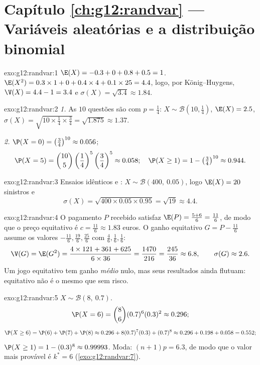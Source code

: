 \section*{Capítulo \ref{ch:g12:randvar} --- Variáveis aleatórias e a distribuição binomial}

\begin{solution}{exo:g12:randvar:1}
$\E(X) = -0.3 + 0 + 0.8 + 0.5 = 1$.
$\E(X^2) = 0.3 \times 1 + 0 + 0.4\times4 + 0.1\times25 = 4.4$, logo, por
König--Huygens, $\V(X) = 4.4 - 1 = 3.4$ e
$\sigma(X) = \sqrt{3.4} \approx 1.84$.
\end{solution}

\begin{solution}{exo:g12:randvar:2}
\emph{1.} As $10$ questões são   com
$p = \frac14$: $X \sim \mathcal B\left(10, \frac14\right)$,
$\E(X) = 2.5$,
$\sigma(X) = \sqrt{10 \times \frac14 \times \frac34} = \sqrt{1.875}
\approx 1.37$.

\emph{2.} $\P(X = 0) = \left(\frac34\right)^{10} \approx 0.056$;
\[
\P(X = 5) = \binom{10}{5}\left(\frac14\right)^5\left(\frac34\right)^5
\approx 0.058;
\quad
\P(X \geq 1) = 1 - \left(\tfrac34\right)^{10} \approx 0.944 .
\]
\end{solution}

\begin{solution}{exo:g12:randvar:3}
Ensaios idênticos e : $X \sim \mathcal B(400,\ 0.05)$, logo
$\E(X) = 20$ sinistros e
\[
\sigma(X) = \sqrt{400 \times 0.05 \times 0.95} = \sqrt{19} \approx 4.4 .
\]
\end{solution}

\begin{solution}{exo:g12:randvar:4}
O pagamento $P$ recebido satisfaz
$\E(P) = \frac{5 + 6}{6} = \frac{11}{6}$, de modo que o preço equitativo é
$c = \frac{11}{6} \approx 1.83$ euros. O ganho equitativo
$G = P - \frac{11}6$ assume os valores
$-\frac{11}{6}, \frac{19}{6}, \frac{25}{6}$ com 
$\frac46, \frac16, \frac16$:
\[
\V(G) = \E(G^2)
= \frac{4 \times 121 + 361 + 625}{6 \times 36} = \frac{1470}{216}
= \frac{245}{36} \approx 6.8,
\qquad \sigma(G) \approx 2.6 .
\]
Um jogo equitativo tem ganho \emph{médio} nulo, mas seus resultados ainda
flutuam: equitativo não é o mesmo que sem risco.
\end{solution}

\begin{solution}{exo:g12:randvar:5}
$X \sim \mathcal B(8,\ 0.7)$.
\[
\P(X = 6) = \binom86 (0.7)^6(0.3)^2 \approx 0.296 ;
\]
\[
\P(X \geq 6) = \P(6) + \P(7) + \P(8)
\approx 0.296 + 8(0.7)^7(0.3) + (0.7)^8
\approx 0.296 + 0.198 + 0.058 = 0.552 ;
\]
$\P(X \geq 1) = 1 - (0.3)^8 \approx 0.99993$. Moda:
$(n+1)p = 6.3$, de modo que o valor mais provável é $k^* = 6$
(\cref{exo:g12:randvar:7}).
\end{solution}

